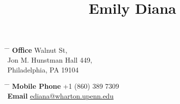 \documentclass[10pt]{article} %
\begin{document}
  

\title{Emily Diana} %


\parbox{0.5\textwidth}{ %
\begin{tabbing} %
\hspace{3cm} \= \hspace{4cm} \= \kill %
{\bf Office}  Walnut St, \\ %
\> Jon M. Hunstman Hall 449, \\ %
\> Philadelphia, PA 19104 \\ %
\end{tabbing}}
\hfill %
\parbox{0.5\textwidth}{ %
\begin{tabbing} %
\hspace{3cm} \= \hspace{4cm} \= \kill %
{\bf Mobile Phone} \> +1 (860) 389 7309 \\ %
{\bf Email} \> \href{mailto:ediana@wharton.upenn.edu}{ediana@wharton.upenn.edu} \\ %
\end{tabbing}}



\end{document}
